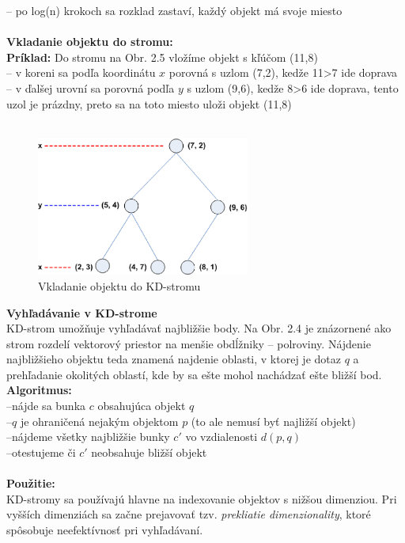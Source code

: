 \documentclass[12pt,oneside]{fithesis2}
\begin{document}
-- po log(n) krokoch sa rozklad zastaví, každý objekt má svoje miesto\\ \\
\textbf{Vkladanie objektu do stromu:}\\
\textbf{Príklad:} Do stromu na Obr. 2.5 vložíme objekt s kľúčom (11,8)\\
-- v koreni sa podľa koordinátu $x$ porovná s uzlom (7,2), kedže 11>7 ide doprava \\
-- v ďalšej urovní sa porovná podľa $y$ s uzlom (9,6), kedže 8>6 ide doprava, tento uzol je prázdny, preto sa na toto miesto uloži objekt (11,8) \\ \\
\begin{figure}
  		\centering
  		\includegraphics[width=7cm]{obr/Kd_tree.eps}
  		\caption{Vkladanie objektu do KD-stromu}
\end{figure}
\textbf{Vyhľadávanie v KD-strome} \\
KD-strom umožňuje vyhľadávať najbližšie body. Na Obr. 2.4 je znázornené ako strom rozdelí vektorový priestor na menšie obdĺžniky -- polroviny. Nájdenie najbližšieho objektu teda znamená najdenie oblasti, v ktorej je dotaz $q$ a prehľadanie okolitých oblastí, kde by sa ešte mohol nachádzať ešte bližší bod.
\\
\textbf{Algoritmus:} \\--nájde sa bunka $c$ obsahujúca objekt $q$ \\
--$q$ je ohraničená nejakým objektom $p$ (to ale nemusí byť najližší objekt)\\
--nájdeme všetky najbližšie bunky $c'$ vo vzdialenosti $d(p,q)$ \\
--otestujeme či $c'$ neobsahuje bližší objekt \\
\\
\textbf{Použitie:}\\
KD-stromy sa používajú hlavne na indexovanie objektov s nižšou dimenziou. Pri vyšších dimenziách sa začne prejavovať tzv. \textit{prekliatie dimenzionality}, ktoré spôsobuje neefektívnosť pri vyhľadávaní.
\end{document}

